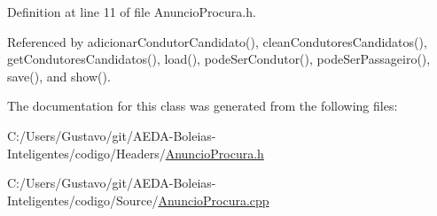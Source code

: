 Definition at line 11 of file Anuncio\+Procura.\+h.



Referenced by adicionar\+Condutor\+Candidato(), clean\+Condutores\+Candidatos(), get\+Condutores\+Candidatos(), load(), pode\+Ser\+Condutor(), pode\+Ser\+Passageiro(), save(), and show().



The documentation for this class was generated from the following files\+:\begin{DoxyCompactItemize}
\item 
C\+:/\+Users/\+Gustavo/git/\+A\+E\+D\+A-\/\+Boleias-\/\+Inteligentes/codigo/\+Headers/\hyperlink{_anuncio_procura_8h}{Anuncio\+Procura.\+h}\item 
C\+:/\+Users/\+Gustavo/git/\+A\+E\+D\+A-\/\+Boleias-\/\+Inteligentes/codigo/\+Source/\hyperlink{_anuncio_procura_8cpp}{Anuncio\+Procura.\+cpp}\end{DoxyCompactItemize}
